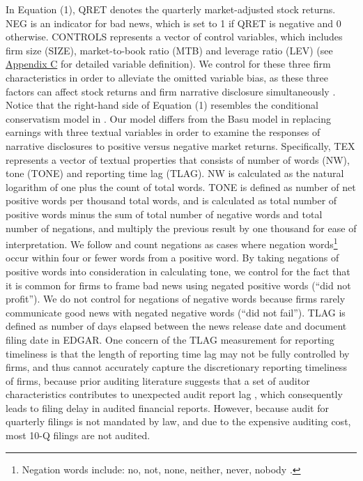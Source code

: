 \documentclass[a4paper]{article}
\begin{document}
\begin{spacing}{2}
In Equation (1), QRET denotes the quarterly market-adjusted stock returns. NEG is an indicator for bad news, which is set to 1 if QRET is negative and 0 otherwise. CONTROLS represents a vector of control variables, which includes firm size (SIZE), market-to-book ratio (MTB) and leverage ratio (LEV) (see \hyperref[appc]{Appendix C} for detailed variable definition). We control for these three firm characteristics in order to alleviate the omitted variable bias, as these three factors can affect stock returns and firm narrative disclosure simultaneously \citep*{liInformationContentForwardLooking2010, huangToneManagement2014}. %
Notice that the right-hand side of Equation (1) resembles the conditional conservatism model in \citet{basuConservatismPrincipleAsymmetric1997}. Our model differs from the Basu model in replacing earnings with three textual variables in order to examine the responses of narrative disclosures to positive versus negative market returns. Specifically, TEX represents a vector of textual properties that consists of number of words (NW), tone (TONE) and reporting time lag (TLAG). NW is calculated as the natural logarithm of one plus the count of total words. TONE is defined as number of net positive words per thousand total words, and is calculated as total number of positive words minus the sum of total number of negative words and total number of negations, and multiply the previous result by one thousand for ease of interpretation. We follow \citet{loughranWhenLiabilityNot2011} and count negations as cases where negation words\footnote{Negation words include: no, not, none, neither, never, nobody \citep*{tottieNegationEnglishSpeech1991}.} occur within four or fewer words from a positive word. By taking negations of positive words into consideration in calculating tone, we control for the fact that it is common for firms to frame bad news using negated positive words (“did not profit”). We do not control for negations of negative words because firms rarely communicate good news with negated negative words (“did not fail”). TLAG is defined as number of days elapsed between the news release date and document filing date in EDGAR. One concern of the TLAG measurement for reporting timeliness is that the length of reporting time lag may not be fully controlled by firms, and thus cannot accurately capture the discretionary reporting timeliness of firms, because prior auditing literature suggests that a set of auditor characteristics contributes to unexpected audit report lag \citep*{knechelAdditionalEvidenceAudit2001, bamberAuditStructureOther1993}, which consequently leads to filing delay in audited financial reports. However, because audit for quarterly filings is not mandated by law, and due to the expensive auditing cost, most 10-Q filings are not audited.


\end{spacing}
\end{document}
